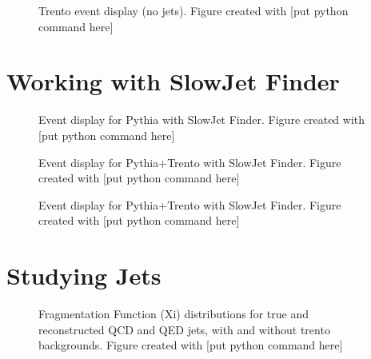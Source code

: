 \documentclass[11pt]{article}
\begin{document}
\begin{figure}[h]
\begin{center}
\label{fig_label}
\caption{Trento event display (no jets).  Figure created with [put python command here]}
\end{center}
\end{figure}

\section{Working with SlowJet Finder}
%
%

\begin{figure}[h]
\begin{center}
\label{fig_label}
\caption{Event display for Pythia with SlowJet Finder.  Figure created with [put python command here]}
\end{center}
\end{figure}

\begin{figure}[h]
\begin{center}
\label{fig_label}
\caption{Event display for Pythia+Trento with SlowJet Finder.  Figure created with [put python command here]}
\end{center}
\end{figure}

\begin{figure}[h]
\begin{center}
\label{fig_label}
\caption{Event display for Pythia+Trento with SlowJet Finder.  Figure created with [put python command here]}
\end{center}
\end{figure}

\section{Studying Jets}
%
%

\begin{figure}[h]
\begin{center}
\label{fig_label}
\caption{Fragmentation Function (Xi) distributions for true and reconstructed QCD and QED jets, with and without trento backgrounds.  Figure created with [put python command here]}
\end{center}
\end{figure}

%
%
\end{document}
